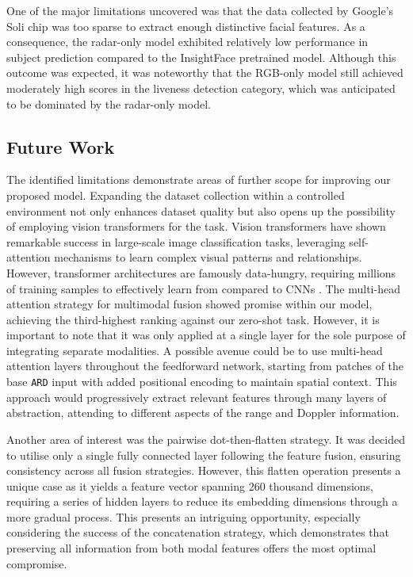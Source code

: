\documentclass{mpaper}
\begin{document}
One of the major limitations uncovered was that the data collected by Google's Soli chip was too sparse to extract enough distinctive facial features. As a consequence, the radar-only model exhibited relatively low performance in subject prediction compared to the InsightFace pretrained model. Although this outcome was expected, it was noteworthy that the RGB-only model still achieved moderately high scores in the liveness detection category, which was anticipated to be dominated by the radar-only model.


\subsection{Future Work}
The identified limitations demonstrate areas of further scope for improving our proposed model. Expanding the dataset collection within a controlled environment not only enhances dataset quality but also opens up the possibility of employing vision transformers for the task. Vision transformers have shown remarkable success in large-scale image classification tasks, leveraging self-attention mechanisms to learn complex visual patterns and relationships. However, transformer architectures are famously data-hungry, requiring millions of training samples to effectively learn from compared to CNNs \cite{dosovitskiy2020image}. The multi-head attention strategy for multimodal fusion showed promise within our model, achieving the third-highest ranking against our zero-shot task. However, it is important to note that it was only applied at a single layer for the sole purpose of integrating separate modalities. A possible avenue could be to use multi-head attention layers throughout the feedforward network, starting from patches of the base \texttt{ARD} input with added positional encoding to maintain spatial context. This approach would progressively extract relevant features through many layers of abstraction, attending to different aspects of the range and Doppler information.

Another area of interest was the pairwise dot-then-flatten strategy. It was decided to utilise only a single fully connected layer following the feature fusion, ensuring consistency across all fusion strategies. However, this flatten operation presents a unique case as it yields a feature vector spanning 260 thousand dimensions, requiring a series of hidden layers to reduce its embedding dimensions through a more gradual process.  This presents an intriguing opportunity, especially considering the success of the concatenation strategy, which demonstrates that preserving all information from both modal features offers the most optimal compromise.
\end{document}
